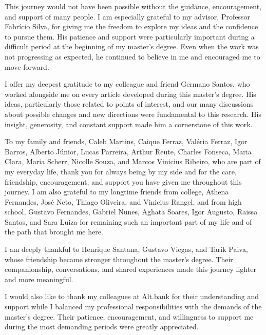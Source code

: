     \ifdefensebuild
    \begin{agradecimentos}
        \singlespacing
        This journey would not have been possible without the guidance, encouragement, and support of many people. I am
        especially grateful to my advisor, Professor Fabrício Silva, for giving me the freedom to explore my ideas and
        the confidence to pursue them. His patience and support were particularly important during a difficult period at
        the beginning of my master’s degree. Even when the work was not progressing as expected, he continued to believe
        in me and encouraged me to move forward.

        I offer my deepest gratitude to my colleague and friend Germano Santos, who worked alongside me on every article
        developed during this master’s degree. His ideas, particularly those related to points of interest, and our many
        discussions about possible changes and new directions were fundamental to this research. His insight,
        generosity, and constant support made him a cornerstone of this work.

        To my family and friends, Caleb Martins, Caique Ferraz, Valéria Ferraz, Igor Barros, Alberto Júnior, Lucas
        Parreira, Arthur Reute, Charles Fonseca, Maria Clara, Maria Scherr, Nicolle Souza, and Marcos Vinicius Ribeiro, who
        are part of my everyday life, thank you for always being by my side and for the care, friendship, encouragement,
        and support you have given me throughout this journey. I am also grateful to my longtime friends from college, Athena
        Fernandes, José Neto, Thiago Oliveira, and Vinicius Rangel, and from high school, Gustavo Fernandes, Gabriel
        Nunes, Aghata Soares, Igor Augusto, Raissa Santos, and Sara Luiza for remaining such an important part of my
        life and of the path that brought me here.

        I am deeply thankful to Henrique Santana, Gustavo Viegas, and Tarik Paiva, whose friendship became stronger
        throughout the master’s degree. Their companionship, conversations, and shared experiences made this journey
        lighter and more meaningful.

        I would also like to thank my colleagues at Alt.bank for their understanding and support while I balanced my
        professional responsibilities with the demands of the master’s degree. Their patience, encouragement, and
        willingness to support me during the most demanding periods were greatly appreciated.


\end{agradecimentos}
